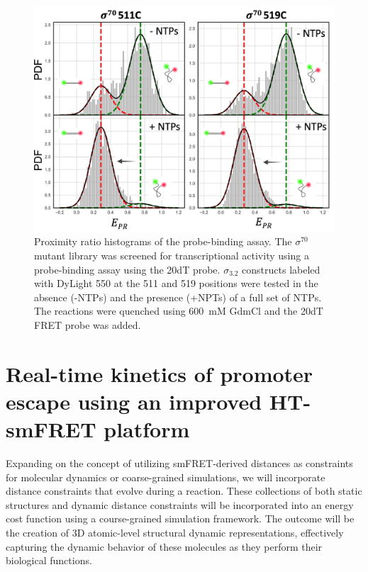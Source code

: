 \begin{figure}
    \centering
    \includegraphics[width=\textwidth]{chapters/figures/mutant_screening_hists.jpg}
    \caption{\label{fig:mutant_screening} 
    Proximity ratio histograms of the probe-binding assay. 
    The $\sigma^{70}$ mutant library was screened for transcriptional activity using a probe-binding assay using the 20dT probe. 
    $\sigma_{3.2}$ constructs labeled with DyLight 550 at the 511 and 519 positions were tested in the absence (-NTPs) and the presence (+NPTs) of a full set of NTPs.
    The reactions were quenched using 600~mM GdmCl and the 20dT FRET probe was added.
    }
\end{figure}


\section{Real-time kinetics of promoter escape using an improved HT-smFRET platform}
\label{sec:HT-smFRET_of_txn_exp}

Expanding on the concept of utilizing \ac{smFRET}-derived distances as constraints for molecular dynamics or coarse-grained simulations, we will incorporate distance constraints that evolve during a reaction.
These collections of both static structures and dynamic distance constraints will be incorporated into an energy cost function using a course-grained simulation framework. 
The outcome will be the creation of 3D atomic-level structural dynamic representations, effectively capturing the dynamic behavior of these molecules as they perform their biological functions.

